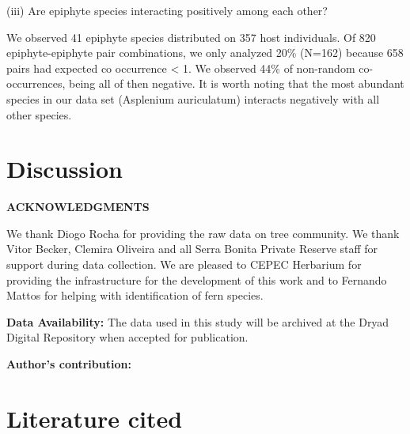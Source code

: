 \documentclass{article}
\begin{document}
(iii) Are epiphyte species interacting positively among each other?

We observed 41 epiphyte species distributed on 357 host individuals. Of 820 epiphyte-epiphyte pair combinations, we only analyzed 20\% (N=162) because 658 pairs had expected co occurrence < 1. We observed 44\% of non-random co-occurrences, being all of then negative. It is worth noting that the most abundant species in our data set (Asplenium auriculatum) interacts negatively with all other species.

\section*{Discussion}

\textbf{ACKNOWLEDGMENTS}

We thank Diogo Rocha for providing the raw data on tree community. We thank Vitor Becker, Clemira Oliveira and all Serra Bonita Private Reserve staff for support during data collection. We are pleased to CEPEC Herbarium for providing the infrastructure for the development of this work and to Fernando Mattos for helping with identification of fern species.


\textbf{Data Availability:} The data used in this study will be archived at the Dryad Digital Repository when accepted for publication.

\textbf{Author's contribution:} 

\section*{Literature cited}
\end{document}
